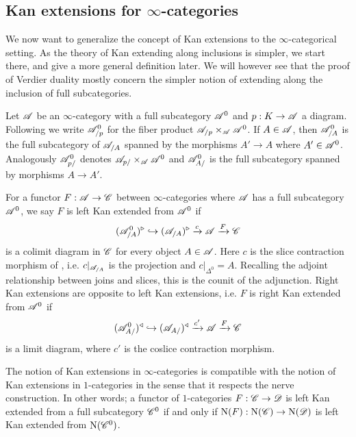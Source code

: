 \documentclass[../../thesis.tex]{subfiles}
\begin{document}
\subsection{Kan extensions for $\infty$-categories}
We now want to generalize the concept of Kan extensions to the $\infty$-categorical setting.
As the theory of Kan extending along inclusions is simpler, we start there, and give a more general definition later.
We will however see that the proof of Verdier duality mostly concern the simpler notion of extending along the inclusion of full subcategories.
\begin{definition}
    Let $\mathscr{A}$ be an $\infty$-category with a full subcategory $\mathscr{A}^0$ and $p:K\to \mathscr{A}$ a diagram.
    Following \cite[Notation 4.3.2.1]{HTT} we write $\mathscr{A}^0_{/p}$ for the fiber product $\mathscr{A}_{/p}\times_{\mathscr{A}}\mathscr{A}^0$.
    If $A\in \mathscr{A}$, then $\mathscr{A}^0_{/A}$ is the full subcategory of $\mathscr{A}_{/A}$ spanned by the morphisms $A'\to A$ where $A'\in \mathscr{A}^0$.
    \newline
    Analogously $\mathscr{A}^0_{p/}$ denotes $\mathscr{A}_{p/}\times_{\mathscr{A}}\mathscr{A}^0$ and $\mathscr{A}^0_{A/}$ is the full subcategory spanned by morphisms $A\to A'$.
\end{definition}
\begin{definition}\label{KanDef}
    For a functor $F: \mathscr{A} \to \mathscr{C}$ between $\infty$-categories where $\mathscr{A}$ has a full subcategory $\mathscr{A}^0$, we say $F$ is left Kan extended from $\mathscr{A}^{0}$ if
    \[
        (\mathscr{A}^{0}_{/A})^{\triangleright} \hookrightarrow (\mathscr{A}_{/A})^{\triangleright} \xrightarrow{c} \mathscr{A} \xrightarrow{F}\mathscr{C}
    \]
    is a colimit diagram in $\mathscr{C}$ for every object $A\in \mathscr{A}$.
    Here $c$ is the slice contraction morphism of \cite[\href{https://kerodon.net/tag/0188}{Tag 0188}]{kerodon}, i.e.
    $c|_{\mathscr{A}_{/A}}$ is the projection and $c|_{\Delta^0}=A$.
    Recalling the adjoint relationship between joins and slices, this is the counit of the adjunction.
    \newline
    Right Kan extensions are opposite to left Kan extensions, i.e. $F$ is right Kan extended from $\mathscr{A}^0$ if
    \[
        (\mathscr{A}^{0}_{A/})^{\triangleleft} \hookrightarrow (\mathscr{A}_{A/})^{\triangleleft} \xrightarrow{c'} \mathscr{A} \xrightarrow{F}\mathscr{C}
    \]
    is a limit diagram, where $c'$ is the coslice contraction morphism.
\end{definition}
\begin{example}
    The notion of Kan extensions in $\infty$-categories is compatible with the notion of Kan extensions in $1$-categories in the sense that it respects the nerve construction.
    In other words; a functor of $1$-categories $F : \mathscr{C} \to \mathscr{D}$ is left Kan extended from a full subcategory $\mathscr{C}^{0}$ if and only if $\mathrm{N}(F) : \mathrm{N}(\mathscr{C}) \to \mathrm{N}(\mathscr{D})$ is left Kan extended from $\mathrm{N}(\mathscr{C}^{0})$.
\end{example}
\end{document}
